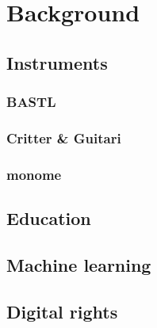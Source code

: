 \chapter{Background}

\section{Instruments}

\subsection{BASTL}

\subsection{Critter \& Guitari}

\subsection{monome}

\section{Education}

\section{Machine learning}

\section{Digital rights}
